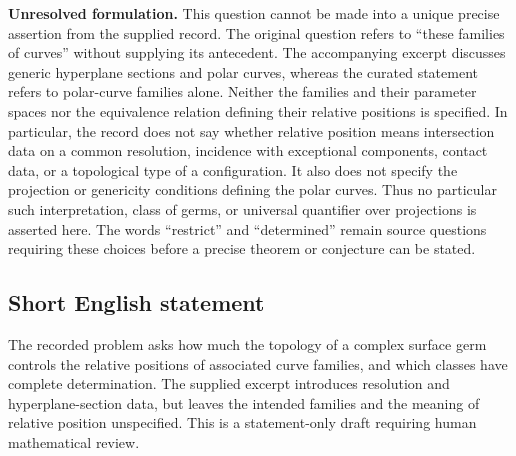 \documentclass[11pt]{article}
\begin{document}
\textbf{Unresolved formulation.} This question cannot be made into a unique precise assertion from the supplied record. The original question refers to ``these families of curves'' without supplying its antecedent. The accompanying excerpt discusses generic hyperplane sections and polar curves, whereas the curated statement refers to polar-curve families alone. Neither the families and their parameter spaces nor the equivalence relation defining their relative positions is specified. In particular, the record does not say whether relative position means intersection data on a common resolution, incidence with exceptional components, contact data, or a topological type of a configuration. It also does not specify the projection or genericity conditions defining the polar curves. Thus no particular such interpretation, class of germs, or universal quantifier over projections is asserted here. The words ``restrict'' and ``determined'' remain source questions requiring these choices before a precise theorem or conjecture can be stated.
\subsection{Short English statement}
The recorded problem asks how much the topology of a complex surface germ controls the relative positions of associated curve families, and which classes have complete determination. The supplied excerpt introduces resolution and hyperplane-section data, but leaves the intended families and the meaning of relative position unspecified. This is a statement-only draft requiring human mathematical review.
\end{document}
